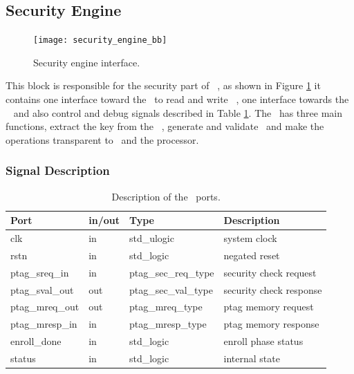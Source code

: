 \subsection{Security Engine}
\label{sec:secengine}

\begin{figure}[!ht]
    \centering
    \texttt{[image: security\_engine\_bb]}
    \caption{Security engine interface.  }
    \label{fig:sebb}
\end{figure}


This block is responsible for the security part of \cshia~,  as shown in Figure \ref{fig:sebb} it contains one interface toward the \ptagmem~to read and write \ptags~, one interface towards the \handler~ and also control and debug signals described in Table \ref{table:seports}.  The \seceng~has three main functions, extract the key from the \puf~, generate and validate \ptags~and make the \ptagmem operations transparent to \handler~and the processor.



\subsubsection{Signal Description}
\begin{table}[H]
    \centering
    \begin{tabular}{l l l l}
    
        \textbf{Port}   & \textbf{in/out} & \textbf{Type}        & \textbf{Description} 	\\ \hline \hline
        clk             & in              & std\_ulogic          & system clock         	\\ \hline
        rstn            & in              & std\_logic           & negated reset         	\\ \hline
        ptag\_sreq\_in  & in              & ptag\_sec\_req\_type & security check request    	\\ \hline
        ptag\_sval\_out & out             & ptag\_sec\_val\_type & security check response  	\\ \hline
        ptag\_mreq\_out & out             & ptag\_mreq\_type 	 & ptag memory  request    	\\ \hline
        ptag\_mresp\_in & in              & ptag\_mresp\_type 	 & ptag memory  response  	\\ \hline
        enroll\_done    & in              &  std\_logic      	 & enroll phase status  	\\ \hline
        status          & in              &  std\_logic      	 & internal state 	\\ \hline
        
    \end{tabular}
    \caption{Description of the \seceng~ports.}
    \label{table:seports}
\end{table}




